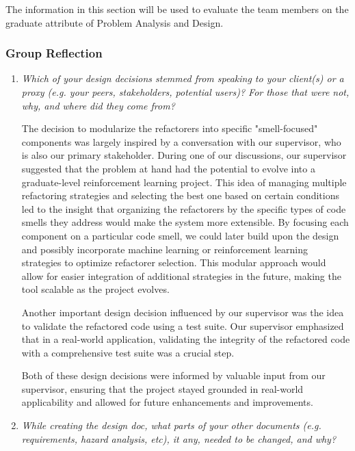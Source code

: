 \documentclass[12pt, titlepage]{article}
\begin{document}

The information in this section will be used to evaluate the team members on the
graduate attribute of Problem Analysis and Design.



\subsubsection*{Group Reflection}

\begin{enumerate}
  \item \textit{Which of your design decisions stemmed from speaking to your client(s)
  or a proxy (e.g. your peers, stakeholders, potential users)? For those that
  were not, why, and where did they come from?}

  The decision to modularize the refactorers into specific "smell-focused" 
  components was largely inspired by a conversation with our supervisor, 
  who is also our primary stakeholder. During one of our discussions, our 
  supervisor suggested that the problem at hand had the potential to 
  evolve into a graduate-level reinforcement learning project. This 
  idea of managing multiple refactoring strategies and selecting the 
  best one based on certain conditions led to the insight that 
  organizing the refactorers by the specific types of code smells 
  they address would make the system more extensible. By focusing 
  each component on a particular code smell, we could later build 
  upon the design and possibly incorporate machine learning or 
  reinforcement learning strategies to optimize refactorer selection. 
  This modular approach would allow for easier integration of additional 
  strategies in the future, making the tool scalable as the project evolves.


  Another important design decision influenced by our supervisor was the 
  idea to validate the refactored code using a test suite. Our supervisor 
  emphasized that in a real-world application, validating the integrity 
  of the refactored code with a comprehensive test suite was a crucial step. 

  Both of these design decisions were informed by valuable input from our 
  supervisor, ensuring that the project stayed grounded in real-world 
  applicability and allowed for future enhancements and improvements.


  \item \textit{While creating the design doc, what parts of your other documents (e.g.
  requirements, hazard analysis, etc), it any, needed to be changed, and why?}
  

\end{enumerate}
\end{document}

